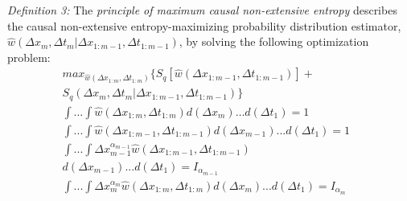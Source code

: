 \textit{Definition 3:} The \textit{principle of maximum causal non-extensive entropy} describes the causal non-extensive entropy-maximizing probability distribution estimator, $\hat{w}(\Delta x_{m},\Delta t_{m}|\Delta x_{1:m-1}, \Delta t_{1:m-1})$, by solving the following optimization problem: 
\begin{eqnarray}
\label{PrincipleOfMaximumPartialConditionalEntropy}
&max_{\hat{w}(\Delta x_{1:m},\Delta t_{1:m})}  \{ S_{q}[\hat{w}(\Delta x_{1:m-1},\Delta t_{1:m-1})] + &\nonumber \\
&S_{q}(\Delta x_{m}, \Delta t_{m}| \Delta x_{1:m-1}, \Delta t_{1:m-1}) \} &\\
&\int \ldots \int \hat{w}(\Delta x_{1:m},\Delta t_{1:m}) d(\Delta x_{m}) \ldots d(\Delta t_{1}) = 1 &  \\
&\int ... \int \hat{w}(\Delta x_{1:m-1},\Delta t_{1:m-1}) d(\Delta x_{m-1}) ... d(\Delta t_{1}) = 1 &  \\
&\int ... \int \Delta x_{m-1}^{\alpha_{m-1}}\hat{w}(\Delta x_{1:m-1},\Delta t_{1:m-1})  &\nonumber\\
& d(\Delta x_{m-1}) ... d(\Delta t_{1}) = I_{\alpha_{m-1}} & \\
&\int ... \int \Delta x_{m}^{\alpha_{m}}\hat{w}(\Delta x_{1:m},\Delta t_{1:m}) d(\Delta x_{m}) ... d(\Delta t_{1}) = I_{\alpha_{m}} & \mbox{  } 
\end{eqnarray}   

